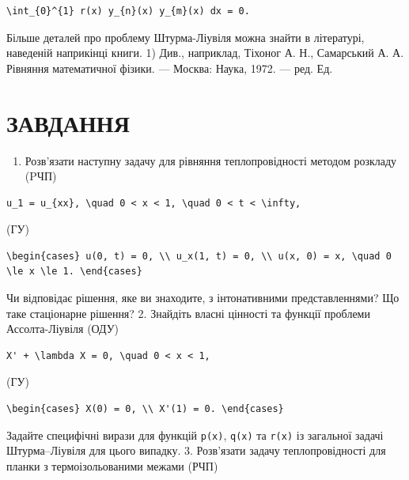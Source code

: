 \documentclass[
  ukrainian,
]{article}
\providecommand{\tightlist}{%
  \setlength{\itemsep}{0pt}\setlength{\parskip}{0pt}}
\begin{document}
\begin{verbatim}
\int_{0}^{1} r(x) y_{n}(x) y_{m}(x) dx = 0.
\end{verbatim}

Більше деталей про проблему Штурма-Ліувіля можна знайти в літературі,
наведеній наприкінці книги. 1) Див., наприклад, Тіхоног А. Н.,
Самарський А. А. Рівняння математичної фізики. --- Москва: Наука, 1972.
--- ред. Ед.

\section{ЗАВДАННЯ}\label{ux437ux430ux432ux434ux430ux43dux43dux44f-4}

\begin{enumerate}
\def\labelenumi{\arabic{enumi}.}
\tightlist
\item
  Розв'язати наступну задачу для рівняння теплопровідності методом
  розкладу (PЧП)
\end{enumerate}

\begin{verbatim}
u_1 = u_{xx}, \quad 0 < x < 1, \quad 0 < t < \infty,
\end{verbatim}

(ГУ)

\begin{verbatim}
\begin{cases} u(0, t) = 0, \\ u_x(1, t) = 0, \\ u(x, 0) = x, \quad 0 \le x \le 1. \end{cases}
\end{verbatim}

Чи відповідає рішення, яке ви знаходите, з інтонативними
представленнями? Що таке стаціонарне рішення? 2. Знайдіть власні
цінності та функції проблеми Ассолта-Ліувіля (ОДУ)

\begin{verbatim}
X' + \lambda X = 0, \quad 0 < x < 1,
\end{verbatim}

(ГУ)

\begin{verbatim}
\begin{cases} X(0) = 0, \\ X'(1) = 0. \end{cases}
\end{verbatim}

Задайте специфічні вирази для функцій \texttt{p(x)}, \texttt{q(x)} та
\texttt{r(x)} із загальної задачі Штурма--Ліувіля для цього випадку. 3.
Розв'язати задачу теплопровідності для планки з термоізольованими межами
(РЧП)
\end{document}
